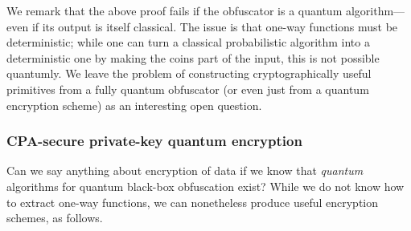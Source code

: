 \documentclass[11pt]{article}
\numberwithin{equation}{section}
\begin{document}
{We remark that the above proof fails if the obfuscator is a quantum algorithm---even if its output is itself classical. The issue is that one-way functions must be deterministic; while one can turn a classical probabilistic algorithm into a deterministic one by making the coins part of the input, this is not possible quantumly. We leave the problem of constructing cryptographically useful primitives from a fully quantum obfuscator (or even just from a quantum encryption scheme) as an interesting open question. 

\subsubsection{CPA-secure private-key quantum encryption}

Can we say anything about encryption of data if we know that \emph{quantum} algorithms for quantum black-box obfuscation exist? While we do not know how to extract one-way functions, we can nonetheless produce useful encryption schemes, as follows.

}
\end{document}
